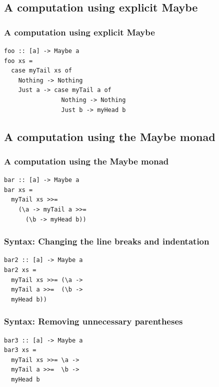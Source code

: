\documentclass{beamer}
\begin{document}
\subsection{A computation using explicit Maybe}
\begin{frame}[fragile]
\frametitle{A computation using explicit Maybe}

\begin{verbatim}
foo :: [a] -> Maybe a
foo xs =
  case myTail xs of
    Nothing -> Nothing
    Just a -> case myTail a of
                Nothing -> Nothing
                Just b -> myHead b
\end{verbatim}

\end{frame}

\subsection{A computation using the Maybe monad}
\begin{frame}[fragile]
\frametitle{A computation using the Maybe monad}

\begin{verbatim}
bar :: [a] -> Maybe a
bar xs =
  myTail xs >>=
    (\a -> myTail a >>=
      (\b -> myHead b))
\end{verbatim}

\end{frame}

\begin{frame}[fragile]
\frametitle{Syntax: Changing the line breaks and indentation}

\begin{verbatim}
bar2 :: [a] -> Maybe a
bar2 xs =
  myTail xs >>= (\a ->
  myTail a >>=  (\b ->
  myHead b))
\end{verbatim}

\end{frame}

\begin{frame}[fragile]
\frametitle{Syntax: Removing unnecessary parentheses}

\begin{verbatim}
bar3 :: [a] -> Maybe a
bar3 xs =
  myTail xs >>= \a ->
  myTail a >>=  \b ->
  myHead b
\end{verbatim}

\end{frame}
\end{document}
